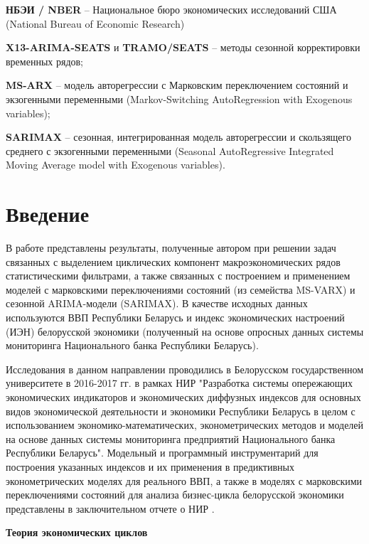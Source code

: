 \documentclass[a4paper,14pt]{extreport}
\begin{document}
	\textbf{НБЭИ / NBER} -- Национальное бюро экономических исследований США (National Bureau of Economic Research)
	
	\textbf{X13-ARIMA-SEATS} и \textbf{TRAMO/SEATS} -- методы сезонной корректировки временных рядов;
	
	\textbf{MS-ARX} -- модель авторегрессии с Марковским переключением состояний и экзогенными переменными (Markov-Switching AutoRegression with Exogenous variables);
	
	\textbf{SARIMAX} -- сезонная, интегрированная модель авторегрессии и скользящего среднего с экзогенными переменными (Seasonal AutoRegressive Integrated Moving Average model with Exogenous variables).
	
	\clearpage
	
	
	\chapter*{Введение}
	В работе представлены результаты, полученные автором при решении задач связанных с выделением циклических компонент макроэкономических рядов статистическими фильтрами, а также связанных с построением и применением моделей с марковскими переключениями состояний (из семейства MS-VARX) и сезонной ARIMA-модели (SARIMAX).	В качестве исходных данных используются ВВП Республики Беларусь и индекс экономических настроений (ИЭН) белорусской экономики (полученный на основе опросных данных системы мониторинга Национального банка Республики Беларусь). 
		
	Исследования в данном направлении проводились в Белорусском государственном университете в 2016-2017 гг. в рамках НИР "Разработка системы опережающих экономических индикаторов и экономических диффузных индексов для основных видов экономической деятельности и экономики Республики Беларусь в целом с использованием экономико-математических, эконометрических методов и моделей на основе данных системы мониторинга предприятий Национального банка Республики Беларусь". Модельный и программный инструментарий для построения указанных  индексов и их применения в предиктивных эконометрических моделях для реального ВВП, а также в моделях с марковскими переключениями состояний для анализа бизнес-цикла белорусской экономики представлены в заключительном отчете о НИР \cite{esiMaking}.
	
	\bigskip
	\textbf{Теория экономических циклов}
	
\end{document}
